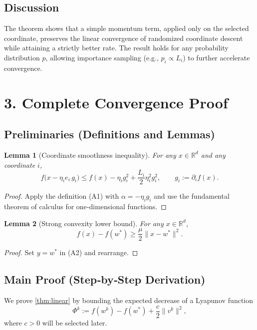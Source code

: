\documentclass[11pt]{article}
\newtheorem{lemma}{Lemma}
\newcommand{\R}{\mathbb{R}}
\begin{document}
\subsection*{Discussion}
The theorem shows that a simple momentum term, applied only on the
selected coordinate, preserves the linear convergence of randomized
coordinate descent while attaining a strictly better rate.
The result holds for any probability distribution $p$, allowing
importance sampling (e.g., $p_i\propto L_i$) to further accelerate
convergence.

\section*{3. Complete Convergence Proof}

\subsection*{Preliminaries (Definitions and Lemmas)}
\begin{lemma}[Coordinate smoothness inequality]\label{lem:smooth}
For any $x\in\R^{d}$ and any coordinate $i$,
\[
f\bigl(x- \eta_i e_i \,g_i\bigr)
\le f(x)-\eta_i g_i^{2}+\frac{L_i}{2}\eta_i^{2}g_i^{2},
\qquad g_i:=\partial_i f(x). \tag{L1}
\]
\end{lemma}
\begin{proof}
Apply the definition (A1) with $\alpha=-\eta_i g_i$ and use the
fundamental theorem of calculus for one‑dimensional functions.
\end{proof}

\begin{lemma}[Strong convexity lower bound]\label{lem:strong}
For any $x\in\R^{d}$,
\[
f(x)-f(w^{*})\ge \frac{\mu}{2}\|x-w^{*}\|^{2}. \tag{L2}
\]
\end{lemma}
\begin{proof}
Set $y=w^{*}$ in (A2) and rearrange.
\end{proof}

\subsection*{Main Proof (Step‑by‑Step Derivation)}
We prove \eqref{thm:linear} by bounding the expected decrease of a
Lyapunov function
\[
\Phi^{k}:= f(w^{k})-f(w^{*}) + \frac{c}{2}\|v^{k}\|^{2},
\]
where $c>0$ will be selected later.
\end{document}

